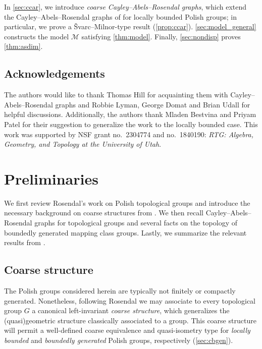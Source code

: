 \documentclass[twoside]{amsart}
\theoremstyle{plain}
\theoremstyle{break}
\theoremstyle{definition}
\theoremstyle{remark}
\newcommand{\M}{\mathcal M}
\begin{document}
\noindent
In \cref{sec:ccar}, we introduce \textit{coarse
Cayley--Abels--Rosendal graphs}, which extend the
Cayley--Abels--Rosendal graphs of \cite{bdhl} for 
locally bounded Polish groups; in particular, we prove a \v
Svarc--Milnor-type result (\cref{prop:ccar}).
\cref{sec:model_general} constructs the model $\M$ satisfying \cref{thm:model}.
Finally, \cref{sec:nondisp} proves \cref{thm:asdim}.

\subsection{Acknowledgements}\label{sec:acknowledge}

The authors would like to thank Thomas Hill for acquainting them with
Cayley--Abels--Rosendal graphs and Robbie Lyman, George Domat and Brian Udall for
helpful discussions. Additionally, the authors thank Mladen Bestvina and Priyam Patel for their suggestion to  generalize the work to the
locally bounded case.  This work was supported by NSF grant no.\
2304774 and no.\ 1840190: \textit{RTG: Algebra, Geometry, and Topology at
the University of Utah}.

\section{Preliminaries}\label{sec:prelim}

We first review Rosendal's work on Polish topological groups and
introduce the necessary background on coarse structures from
\cite{rosendal}. We then recall Cayley--Abels--Rosendal graphs for
topological groups {\cite{bdhl}} and several facts on the topology
of boundedly generated mapping class groups. Lastly, we summarize
the relevant results from \cite{shift}.
 

\subsection{Coarse structure}\label{sec:coarse}

The Polish groups considered herein are typically not finitely or
compactly generated.  Nonetheless, following Rosendal
 we may associate to every topological group $G$ 
a canonical left-invariant \textit{coarse structure},
which generalizes the (quasi)geometric structure classically
associated to a group.  This coarse structure will permit a
well-defined
 coarse equivalence and quasi-isometry
type for \textit{locally bounded} and \textit{boundedly generated}
Polish groups, respectively (\cref{sec:cbgen}).  
\end{document}
